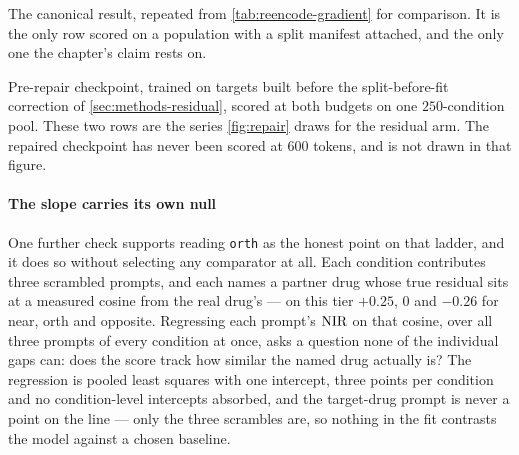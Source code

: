 \begin{table}[htbp]
\begin{fullwidth}
\begin{threeparttable}
\begin{tabular}{@{}l r r l l l@{}}
  \end{tabular}
  \begin{tablenotes}[flushleft]
  \item[a] The canonical result, repeated from \cref{tab:reencode-gradient} for
  comparison. It is the only row scored on a population with a split manifest
  attached, and the only one the chapter's claim rests on.
  \item[b] Pre-repair checkpoint, trained on targets built before the
  split-before-fit correction of \cref{sec:methods-residual}, scored at both
  budgets on one $\num{250}$-condition pool. These two rows are the series
  \cref{fig:repair} draws for the residual arm. The repaired checkpoint has never
  been scored at $600$ tokens, and is not drawn in that figure.
  \end{tablenotes}
  \end{threeparttable}
  \end{fullwidth}
  \end{table}

  \paragraph{The slope carries its own null}
  One further check supports reading \texttt{orth} as the honest point on that
ladder, and it does so without selecting any comparator at all. Each condition
contributes three scrambled prompts, and each names a partner drug whose true
residual sits at a measured cosine from the real drug's --- on this tier
$+0.25$, $0$ and $-0.26$ for near, orth and opposite.  Regressing each prompt's $\textrm{NIR}$ on
that cosine, over all three prompts of every condition at once, asks a question
none of the individual gaps can: does the score track how similar the named drug
actually is? The regression is pooled least squares with one intercept, three
points per condition and no condition-level intercepts absorbed, and the
target-drug prompt is never a point on the line --- only the three scrambles
are, so nothing in the fit contrasts the model against a chosen baseline.

